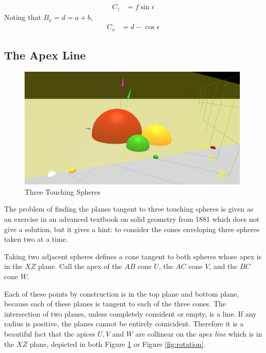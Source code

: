 \documentclass{article}
\begin{document}
\begin{align}
 C_z  &= f\sin{\epsilon}
\end{align}
Noting that $B_x = d = a + b$,
\begin{align}
  C_x   &= d - \cos{\epsilon}
\end{align}


\subsection{The Apex Line}

\begin{figure}
     \centering
     \includegraphics[width=0.99\textwidth]{figures/StandardThreeSphereDiagram.png}
     \caption{Three Touching Spheres}
  \label{fig:fixed}
\end{figure}

The problem of finding the planes tangent to three touching spheres
is given as an exercise in an advanced textbook on solid geometry from 1881\cite{payne1881} which does not give a solution,
but it gives a hint: to consider the cones enveloping
three spheres taken two at a time.

Taking two adjacent spheres defines a cone tangent to both spheres whose apex is in the $XZ$ plane.
Call the apex of the $AB$ cone $U$, the $AC$ cone $V$, and the $BC$ cone $W$.


Each of these points by construction is in the top plane and bottom plane, because each of these planes
is tangent to each of the three cones.
The intersection of two planes, unless completely consident or empty, is a line.
If any radius is positive, the planes cannot be entirely coinicident.
Therefore it is a beautiful fact that the apices $U,V$ and $W$ are collinear
on the {\em apex line} which is in the $XZ$ plane, depicted in both Figure \ref{fig:fixed}
or Figure \ref{fig:rotation}.
\end{document}
